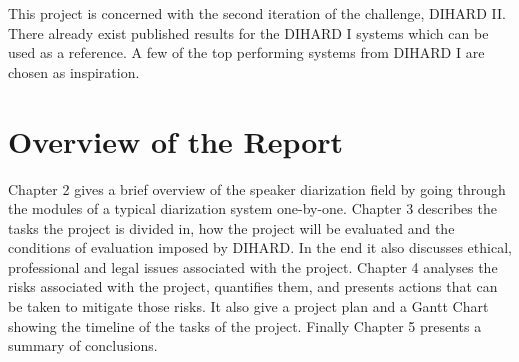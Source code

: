 This project is concerned with the second iteration of the challenge, DIHARD II. There already exist published results for the DIHARD I systems which can be used as a reference. A few of the top performing systems from DIHARD I are chosen as inspiration.

\section{Overview of the Report}

Chapter 2 gives a brief overview of the speaker diarization field by going through the modules of a typical diarization system one-by-one. Chapter 3 describes the tasks the project is divided in, how the project will be evaluated and the conditions of evaluation imposed by DIHARD. In the end it also discusses ethical, professional and legal issues associated with the project. Chapter 4 analyses the risks associated with the project, quantifies them, and presents actions that can be taken to mitigate those risks. It also give a project plan and a Gantt Chart showing the timeline of the tasks of the project. Finally Chapter 5 presents a summary of conclusions.